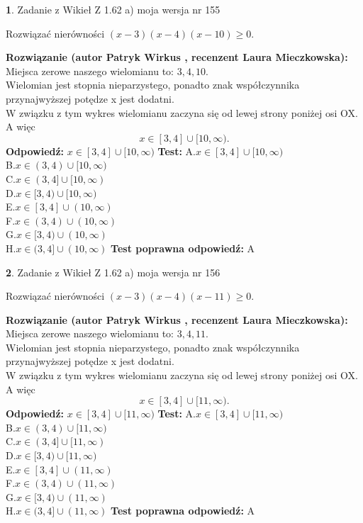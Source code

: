 \documentclass[12pt, a4paper]{article}
\theoremstyle{definition} %
\newtheorem{zad}{}
\newcommand{\zadStart}[1]{\begin{zad}#1\newline}
\newcommand{\zadStop}{\end{zad}}
\newcommand{\rozwStart}[2]{\noindent \textbf{Rozwiązanie (autor #1 , recenzent #2): }\newline}
\newcommand{\rozwStop}{\newline}
\newcommand{\odpStart}{\noindent \textbf{Odpowiedź:}\newline}
\newcommand{\odpStop}{\newline}
\newcommand{\testStart}{\noindent \textbf{Test:}\newline}
\newcommand{\testStop}{\newline}
\newcommand{\kluczStart}{\noindent \textbf{Test poprawna odpowiedź:}\newline}
\newcommand{\kluczStop}{\newline}
\begin{document}
\zadStart{Zadanie z Wikieł Z 1.62 a) moja wersja nr 155}

Rozwiązać nierówności $(x-3)(x-4)(x-10)\ge0$.
\zadStop
\rozwStart{Patryk Wirkus}{Laura Mieczkowska}
Miejsca zerowe naszego wielomianu to: $3, 4, 10$.\\
Wielomian jest stopnia nieparzystego, ponadto znak współczynnika przy\linebreak najwyższej potędze x jest dodatni.\\ W związku z tym wykres wielomianu zaczyna się od lewej strony poniżej osi OX. A więc $$x \in [3,4] \cup [10,\infty).$$
\rozwStop
\odpStart
$x \in [3,4] \cup [10,\infty)$
\odpStop
\testStart
A.$x \in [3,4] \cup [10,\infty)$\\
B.$x \in (3,4) \cup [10,\infty)$\\
C.$x \in (3,4] \cup [10,\infty)$\\
D.$x \in [3,4) \cup [10,\infty)$\\
E.$x \in [3,4] \cup (10,\infty)$\\
F.$x \in (3,4) \cup (10,\infty)$\\
G.$x \in [3,4) \cup (10,\infty)$\\
H.$x \in (3,4] \cup (10,\infty)$
\testStop
\kluczStart
A
\kluczStop



\zadStart{Zadanie z Wikieł Z 1.62 a) moja wersja nr 156}

Rozwiązać nierówności $(x-3)(x-4)(x-11)\ge0$.
\zadStop
\rozwStart{Patryk Wirkus}{Laura Mieczkowska}
Miejsca zerowe naszego wielomianu to: $3, 4, 11$.\\
Wielomian jest stopnia nieparzystego, ponadto znak współczynnika przy\linebreak najwyższej potędze x jest dodatni.\\ W związku z tym wykres wielomianu zaczyna się od lewej strony poniżej osi OX. A więc $$x \in [3,4] \cup [11,\infty).$$
\rozwStop
\odpStart
$x \in [3,4] \cup [11,\infty)$
\odpStop
\testStart
A.$x \in [3,4] \cup [11,\infty)$\\
B.$x \in (3,4) \cup [11,\infty)$\\
C.$x \in (3,4] \cup [11,\infty)$\\
D.$x \in [3,4) \cup [11,\infty)$\\
E.$x \in [3,4] \cup (11,\infty)$\\
F.$x \in (3,4) \cup (11,\infty)$\\
G.$x \in [3,4) \cup (11,\infty)$\\
H.$x \in (3,4] \cup (11,\infty)$
\testStop
\kluczStart
A
\kluczStop
\end{document}
